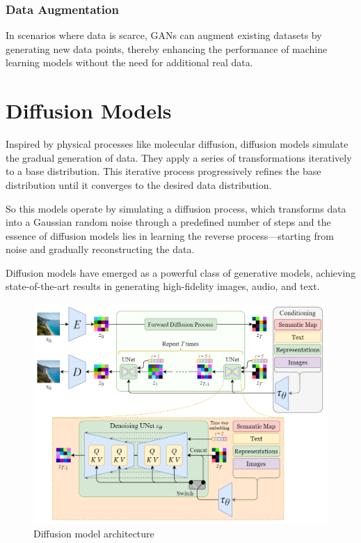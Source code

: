 \documentclass{article}
\begin{document}
			\subsubsection{Data Augmentation}

				In scenarios where data is scarce, GANs can augment existing datasets by generating new data points, thereby enhancing the performance of machine learning models without the need for additional real data.

	\section{Diffusion Models}

		Inspired by physical processes like molecular diffusion, diffusion models simulate the gradual generation of data. They apply a series of transformations iteratively to a base distribution. This iterative process progressively refines the base distribution until it converges to the desired data distribution.

		So this models operate by simulating a diffusion process, which transforms data into a Gaussian random noise through a predefined number of steps and the essence of diffusion models lies in learning the reverse process—starting from noise and gradually reconstructing the data.

		Diffusion models have emerged as a powerful class of generative models, achieving state-of-the-art results in generating high-fidelity images, audio, and text.

		\begin{figure}[H]
			\centering
			\includegraphics[width=0.8\linewidth]{images/diffusion-model.png}
			\caption{Diffusion model architecture}
			\label{fig:diffusion-model}
		\end{figure}
\end{document}
